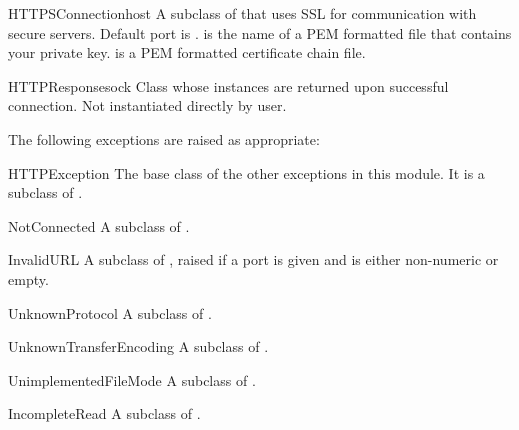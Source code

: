 \begin{classdesc}{HTTPSConnection}{host}
A subclass of  that uses SSL for communication with
secure servers.  Default port is .
 is
the name of a PEM formatted file that contains your private
key.  is a PEM formatted certificate chain file.


\end{classdesc}

\begin{classdesc}{HTTPResponse}{sock}
Class whose instances are returned upon successful connection.  Not
instantiated directly by user.
\end{classdesc}

The following exceptions are raised as appropriate:

\begin{excdesc}{HTTPException}
The base class of the other exceptions in this module.  It is a
subclass of .
\end{excdesc}

\begin{excdesc}{NotConnected}
A subclass of .
\end{excdesc}

\begin{excdesc}{InvalidURL}
A subclass of , raised if a port is given and is
either non-numeric or empty.
\end{excdesc}

\begin{excdesc}{UnknownProtocol}
A subclass of .
\end{excdesc}

\begin{excdesc}{UnknownTransferEncoding}
A subclass of .
\end{excdesc}

\begin{excdesc}{UnimplementedFileMode}
A subclass of .
\end{excdesc}

\begin{excdesc}{IncompleteRead}
A subclass of .
\end{excdesc}

